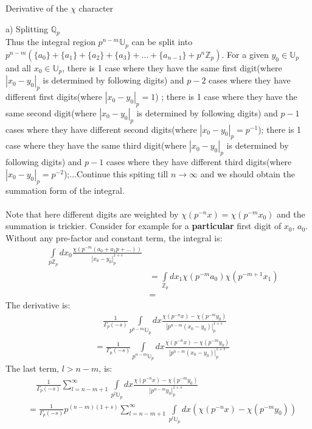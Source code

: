 \documentclass[12pt]{article}
\begin{document}
\begin{section}{Derivative of the $\chi$ character}
\begin{paragraph}{a) Splitting $\mathbb{Q}_p$}
\\Thus the integral region $p^{n-m}\mathbb{U}_p$ can be split into $p^{n-m}(\{a_0\}+\{a_1\}+\{a_2\}+\{a_3\}+...+\{a_{n-1}\}+p^n\mathbb{Z}_p)$. For a given $y_0\in\mathbb{U}_p$ and all $x_0\in\mathbb{U}_p$, there is 1 case where they have the same first digit(where $|x_0-y_0|_p$ is determined by following digits) and $p-2$ cases where they have different first digits(where $|x_0-y_0|_p=1$) ; there is 1 case where they have the same second digit(where $|x_0-y_0|_p$ is determined by following digits) and $p-1$ cases where they have different second digits(where $|x_0-y_0|_p=p^{-1}$); there is 1 case where they have the same third digit(where $|x_0-y_0|_p$ is determined by following digits) and $p-1$ cases where they have different third digits(where $|x_0-y_0|_p=p^{-2}$);...Continue this spiting till $n\to\infty$ and we should obtain the summation form of the integral. \\
\\Note that here different digits are weighted by $\chi(p^{-n}x)=\chi(p^{-m}x_0)$ and the summation is trickier. Consider for example for a \textbf{particular} first digit of $x_0$, $a_0$. Without any pre-factor and constant term, the integral is:
\begin{equation}
\begin{split}
\quad \int\limits_{p\mathbb{Z}_p}dx_0\frac{\chi(p^{-m}(a_0+a_1 p+...))}{|x_0-y_0|_p^{1+s}} \\
&=\int\limits_{\mathbb{Z}_p}dx_1\chi(p^{-m}a_0)\chi(p^{-m+1}x_1)\\
&=
\end{split}
\end{equation} 
The derivative is:
\begin{equation}
\begin{split}
&\quad\frac{1}{\Gamma_p (-s)} \int\limits _{p^{n-m}\mathbb{U}_p}dx\frac{\chi( p^{-n} x) - \chi( p^{-m}y_0)}{|p^{n-m}(x_0-y_0)|_p^{1+s}}\\
&=\frac{1}{\Gamma_p (-s)} \int\limits _{p^{n-m}\mathbb{U}_p}dx\frac{\chi( p^{-n} x) - \chi( p^{-m}y_0)}{|p^{n-m}(x_0-y_0)|_p^{1+s}}
\end{split}
\end{equation}
The last term, $l>n-m$, is:
\begin{equation}
\begin{split}
&\quad\frac{1}{\Gamma_p (-s)} \sum_{l=n-m+1}^{\infty} \int\limits _{p^l \mathbb{U}_p}dx\frac{\chi( p^{-n} x) - \chi( p^{-m}y_0)}{|p^{n-m}y_0|_p^{1+s}}\\
&=\frac{1}{\Gamma_p (-s)} p^{(n-m)(1+s)} \sum_{l=n-m+1}^{\infty} \int\limits _{p^l \mathbb{U}_p}dx (\chi( p^{-n} x) - \chi( p^{-m}y_0))\\

\end{split}
\end{equation}
\end{paragraph}
\end{section}
\end{document}
